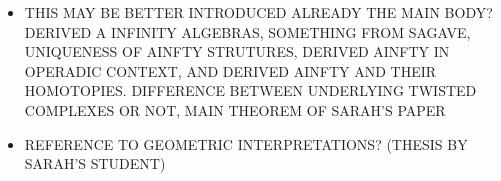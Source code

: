 \documentclass[Thesis.tex]{subfiles}
\begin{document}
\begin{itemize}





\item THIS MAY BE BETTER INTRODUCED ALREADY THE MAIN BODY? DERIVED A INFINITY ALGEBRAS, SOMETHING  FROM SAGAVE, UNIQUENESS OF AINFTY STRUTURES, DERIVED AINFTY IN OPERADIC CONTEXT, AND DERIVED AINFTY AND THEIR HOMOTOPIES. DIFFERENCE BETWEEN UNDERLYING TWISTED COMPLEXES OR NOT, MAIN THEOREM OF SARAH'S PAPER

\item REFERENCE TO GEOMETRIC INTERPRETATIONS? (THESIS BY SARAH'S STUDENT)


\end{itemize}

%
%
\end{document}
